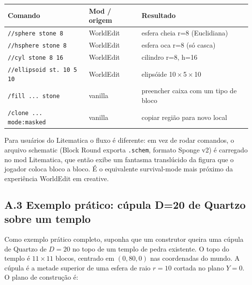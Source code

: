 \documentclass[12pt,a4paper]{scrartcl}
\newcommand{\code}[1]{\texttt{\small #1}}
\newcommand{\cmd}[1]{\textcolor{earth}{\texttt{\small #1}}}
\begin{document}
\vspace{0.4em}
\begin{center}
\small
\begin{tabularx}{\textwidth}{@{}llX@{}}
\toprule
\textbf{Comando} & \textbf{Mod / origem} & \textbf{Resultado} \\
\midrule
\cmd{//sphere stone 8}     & WorldEdit & esfera cheia r=8 (Euclidiana)  \\
\cmd{//hsphere stone 8}    & WorldEdit & esfera oca r=8 (só casca)  \\
\cmd{//cyl stone 8 16}     & WorldEdit & cilindro r=8, h=16  \\
\cmd{//ellipsoid st. 10 5 10} & WorldEdit & elipsóide 10\,$\times$\,5\,$\times$\,10  \\
\cmd{/fill ... stone}      & vanilla & preencher caixa com um tipo de bloco  \\
\cmd{/clone ... mode:masked} & vanilla & copiar região para novo local  \\
\bottomrule
\end{tabularx}
\end{center}

Para usuários do Litematica o fluxo é diferente: em vez de rodar comandos, o arquivo schematic (Block Round exporta \code{.schem}, formato Sponge v2) é carregado no mod Litematica, que então exibe um fantasma translúcido da figura que o jogador coloca bloco a bloco. É o equivalente survival-mode mais próximo da experiência WorldEdit em creative.

\subsection*{A.3 Exemplo prático: cúpula D=20 de Quartzo sobre um templo}
Como exemplo prático completo, suponha que um construtor queira uma cúpula de Quartzo de $D=20$ no topo de um templo de pedra existente. O topo do templo é $11 \times 11$ blocos, centrado em $(0,80,0)$ nas coordenadas do mundo. A cúpula é a metade superior de uma esfera de raio $r=10$ cortada no plano $Y=0$. O plano de construção é:
\end{document}
